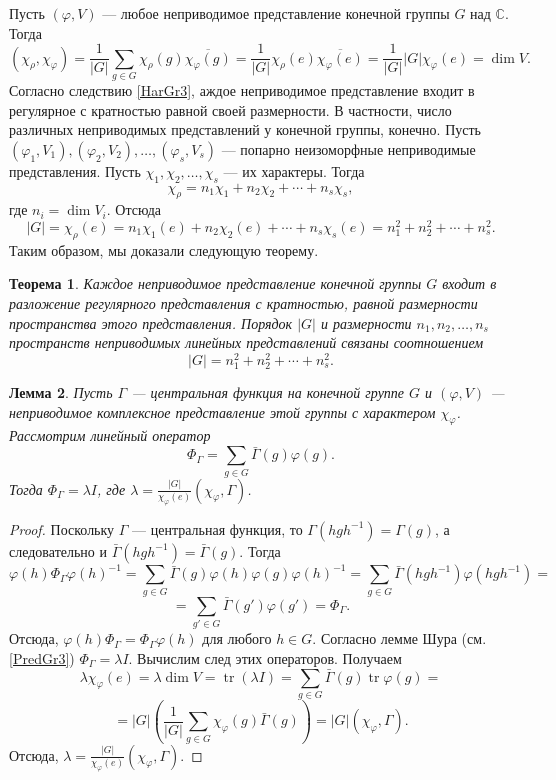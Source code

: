 \documentclass[12pt, titlepage, oneside]{amsbook}
\newcommand{\tr}{\operatorname{tr}}
\newcommand{\CC}{\mathbb{C}}
\newtheorem{theorem}{Теорема}[chapter]
\newtheorem{lemma}[theorem]{Лемма}
\theoremstyle{definition}
\theoremstyle{remark}
\begin{document}
Пусть $(\varphi,V)$ --- любое неприводимое представление конечной группы $G$ над $\CC$. Тогда $$(\chi_{\rho},\chi_{\varphi})=\frac{1}{|G|}\sum\limits_{g\in G}\chi_{\rho}(g)\overline{\chi_{\varphi}(g)}=\frac{1}{|G|}\chi_{\rho}(e)\overline{\chi_{\varphi}(e)}=\frac{1}{|G|}|G|\chi_{\varphi}(e)=\dim V.$$ Согласно следствию \ref{HarGr3}, аждое неприводимое представление входит в регулярное с кратностью равной своей размерности. В частности, число различных неприводимых представлений у конечной группы, конечно. Пусть $(\varphi_1,V_1), (\varphi_2,V_2),\ldots, (\varphi_s,V_s)$ --- попарно неизоморфные неприводимые представления. Пусть $\chi_1,\chi_2,\ldots,\chi_s$ --- их характеры. Тогда $$\chi_{\rho}=n_1\chi_1+n_2\chi_2+\cdots+n_s\chi_s,$$ где $n_i=\dim V_i$. Отсюда $$|G|=\chi_{\rho}(e)=n_1\chi_1(e)+n_2\chi_2(e)+\cdots+n_s\chi_s(e)=n_1^2+n_2^2+\cdots+n_s^2.$$ Таким образом, мы доказали следующую теорему.

\begin{theorem}
	\label{HarGr5}
	Каждое неприводимое представление конечной группы $G$ входит в разложение регулярного представления с кратностью, равной размерности пространства этого представления. Порядок $|G|$ и размерности $n_1,n_2,\ldots,n_s$ пространств неприводимых линейных представлений связаны соотношением $$|G|=n_1^2+n_2^2+\cdots+n_s^2.$$
\end{theorem}

\begin{lemma}
	\label{HarGrL1}
	Пусть $\Gamma$ --- центральная функция на конечной группе $G$ и $(\varphi,V)$ --- неприводимое комплексное представление этой группы с характером $\chi_{\varphi}$. Рассмотрим линейный оператор $$\Phi_{\Gamma}=\sum\limits_{g\in G}\bar{\Gamma}(g)\varphi(g).$$ Тогда $\Phi_{\Gamma}=\lambda I$, где $\lambda=\frac{|G|}{\chi_{\varphi}(e)}(\chi_{\varphi},\Gamma)$.
\end{lemma}

\begin{proof}
	Поскольку $\Gamma$ --- центральная функция, то $\Gamma(hgh^{-1})=\Gamma(g)$, а следовательно и $\bar{\Gamma}(hgh^{-1})=\bar{\Gamma}(g)$. Тогда $$\varphi(h)\Phi_{\Gamma}\varphi(h)^{-1}=\sum\limits_{g\in G}\bar{\Gamma}(g)\varphi(h)\varphi(g)\varphi(h)^{-1}=\sum\limits_{g\in G}\bar{\Gamma}(hgh^{-1})\varphi(hgh^{-1})=$$ $$=\sum\limits_{g'\in G}\bar{\Gamma}(g')\varphi(g')=\Phi_{\Gamma}.$$ Отсюда, $\varphi(h)\Phi_{\Gamma}=\Phi_{\Gamma}\varphi(h)$ для любого $h\in G$. Согласно лемме Шура (см. \ref{PredGr3}) $\Phi_{\Gamma}=\lambda I$. Вычислим след этих операторов. Получаем $$\lambda\chi_{\varphi}(e)=\lambda\dim V=\tr(\lambda I)=\sum\limits_{g\in G}\bar{\Gamma}(g)\tr\varphi(g)=$$ $$=|G|\left(\frac{1}{|G|}\sum\limits_{g\in G}\chi_{\varphi}(g)\bar{\Gamma}(g)\right)=|G|(\chi_{\varphi},\Gamma).$$
	Отсюда, $\lambda=\frac{|G|}{\chi_{\varphi}(e)}(\chi_{\varphi},\Gamma)$.
\end{proof}
\end{document}
